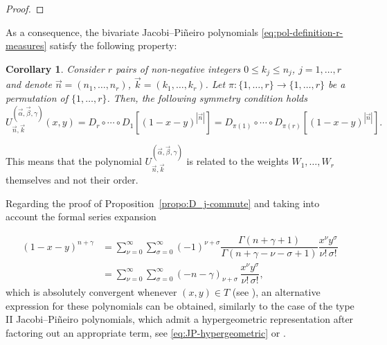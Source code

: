 \documentclass[11pt,reqno]{amsart}
\newtheorem{corollary}[theorem]{Corollary}
\theoremstyle{definition}
\begin{document}
\begin{proof}
\end{proof}

As a consequence, the bivariate Jacobi--Piñeiro polynomials \eqref{eq:pol-definition-r-measures} satisfy the following property:

\begin{corollary}
    \label{cor:symmetry}
    Consider $r$ pairs of non-negative integers $0\leq k_j \leq n_j$, $j=1,\dots,r$ and denote $\vec n =(n_1,\dots,n_r)$, $\vec k=(k_1,\dots,k_r)$. Let $\pi:\{1,\dots,r\}\longrightarrow\{1,\dots,r\}$ be a permutation of $\{1,\dots,r\}$. Then, the following symmetry condition holds
    $$U_{\vec n,\vec k}^{(\vec\alpha,\vec\beta,\gamma)}(x,y)=D_r\circ\cdots\circ D_1[(1-x-y)^{|\vec n|}]=D_{\pi(1)}\circ\cdots\circ D_{\pi(r)}[(1-x-y)^{|\vec n|}].$$
\end{corollary}
    
This means that the polynomial $U_{\vec n,\vec k}^{(\vec\alpha,\vec\beta,\gamma)}$ is related to the weights $W_1,\dots,W_r$ themselves and not their order. 

Regarding the proof of Proposition~\ref{propo:D_j-commute} and taking into account the formal series expansion

\begin{equation}
    \label{eq:expansion}
    \begin{aligned}
        (1-x-y)^{n+\gamma}&= \sum_{\nu=0}^{\infty}\sum_{\sigma=0}^\infty (-1)^{\nu+\sigma}\dfrac{\Gamma(n+\gamma+1)}{\Gamma(n+\gamma-\nu-\sigma+1)} \dfrac{x^\nu y^\sigma}{\nu!\,\sigma!}\\
        &=\sum_{\nu=0}^{\infty}\sum_{\sigma=0}^\infty (-n-\gamma)_{\nu+\sigma}\,\dfrac{x^\nu y^\sigma}{\nu!\,\sigma!} ,
    \end{aligned}
\end{equation}
which is absolutely convergent whenever $(x,y)\in T$ (see \citep[Chapter 16]{OLBC10}),
an alternative expression for these polynomials can be obtained,
similarly to the case of the type II Jacobi--Pi\~neiro polynomials, which
admit a hypergeometric representation after factoring out an appropriate term, see \eqref{eq:JP-hypergeometric} or  \citep[Theorem 3.5]{BCVA05}.
\end{document}
